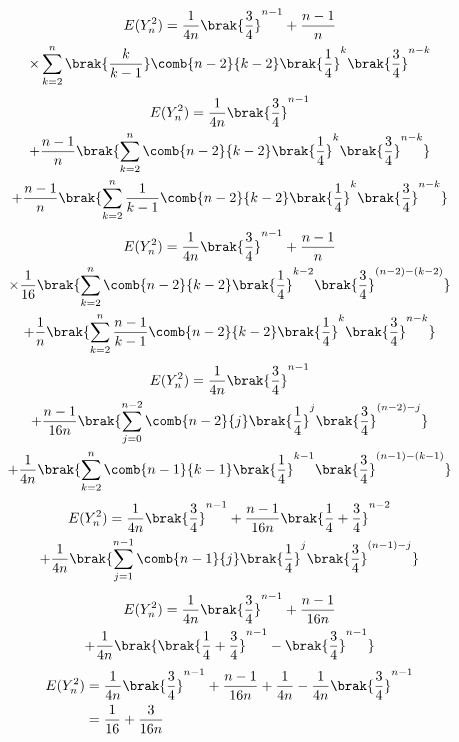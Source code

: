 \begin{multline}
    E(Y_n^2) =  \frac{1}{4n}\brak{\frac{3}{4}}^{n-1} + \frac{n-1}{n} 
   \\\times\sum_{k=2}^{n} \brak{\frac{k}{k-1}}\comb{n-2}{k-2}\brak{\frac{1}{4}}^{k} \brak{\frac{3}{4}}^{n-k}
\end{multline}
\begin{multline}
    E(Y_n^2)  = \frac{1}{4n}\brak{\frac{3}{4}}^{n-1} \\+ \frac{n-1}{n} 
   \brak{\sum_{k=2}^{n}\comb{n-2}{k-2}\brak{\frac{1}{4}}^{k} \brak{\frac{3}{4}}^{n-k} }
   \\+\frac{n-1}{n} \brak{\sum_{k=2}^{n}\frac{1}{k-1}\comb{n-2}{k-2}\brak{\frac{1}{4}}^{k} \brak{\frac{3}{4}}^{n-k} } 
\end{multline}
\begin{multline}
    E(Y_n^2)  = \frac{1}{4n}\brak{\frac{3}{4}}^{n-1} + \frac{n-1}{n}\\ \times\frac{1}{16} 
   \brak{\sum_{k=2}^{n}\comb{n-2}{k-2}\brak{\frac{1}{4}}^{k-2} \brak{\frac{3}{4}}^{(n-2)-(k-2)} }
   \\+\frac{1}{n} \brak{\sum_{k=2}^{n}\frac{n-1}{k-1}\comb{n-2}{k-2}\brak{\frac{1}{4}}^{k} \brak{\frac{3}{4}}^{n-k} }
\end{multline}
\begin{multline}
     E(Y_n^2)= \frac{1}{4n}\brak{\frac{3}{4}}^{n-1} \\+ \frac{n-1}{16n} 
   \brak{\sum_{j=0}^{n-2}\comb{n-2}{j}\brak{\frac{1}{4}}^{j} \brak{\frac{3}{4}}^{(n-2)-j} }
   \\+\frac{1}{4n} \brak{\sum_{k=2}^{n}\comb{n-1}{k-1}\brak{\frac{1}{4}}^{k-1} \brak{\frac{3}{4}}^{(n-1)-(k-1)} } 
\end{multline}
\begin{multline}
    E(Y_n^2) = \frac{1}{4n}\brak{\frac{3}{4}}^{n-1} + \frac{n-1}{16n}\brak{\frac{1}{4} + \frac{3}{4}}^{n-2}
   \\+\frac{1}{4n} \brak{\sum_{j=1}^{n-1}\comb{n-1}{j}\brak{\frac{1}{4}}^{j} \brak{\frac{3}{4}}^{(n-1)-j} }
\end{multline}
\begin{multline}
   E(Y_n^2) = \frac{1}{4n}\brak{\frac{3}{4}}^{n-1} + \frac{n-1}{16n}
   \\+\frac{1}{4n} \brak{\brak{\frac{1}{4} + \frac{3}{4}}^{n-1} - \brak{\frac{3}{4}}^{n-1}} 
\end{multline}
\begin{align}
    E(Y_n^2) &= \frac{1}{4n}\brak{\frac{3}{4}}^{n-1} + \frac{n-1}{16n} +\frac{1}{4n} - \frac{1}{4n}\brak{\frac{3}{4}}^{n-1}
    \\&= \frac{1}{16} + \frac{3}{16n} \label{ma2018-25:equation 2}
\end{align}
